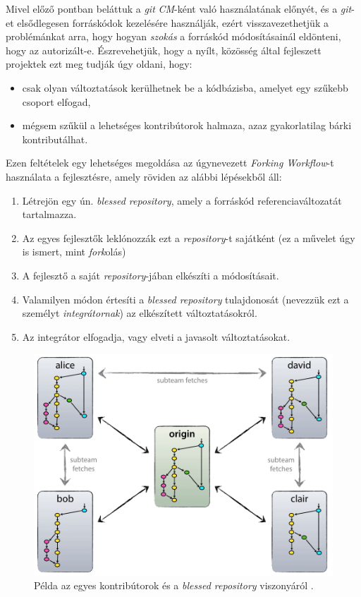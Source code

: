 Mivel előző pontban beláttuk a \emph{git} \emph{CM}-ként való  használatának előnyét, és
a \emph{git}-et elsődlegesen forráskódok kezelésére használják, ezért visszavezethetjük
a problémánkat arra, hogy hogyan \emph{szokás} a forráskód módosításainál eldönteni, hogy az
autorizált-e.  Észrevehetjük, hogy a nyílt, közösség által fejleszett projektek ezt meg tudják úgy
oldani, hogy:
\begin{itemize}
    \item{csak olyan változtatások kerülhetnek be a kódbázisba, amelyet egy szűkebb csoport
        elfogad,}
    \item{mégsem szűkül a lehetséges kontribútorok halmaza, azaz gyakorlatilag bárki
        kontributálhat.}
\end{itemize}

Ezen feltételek egy lehetséges megoldása az úgynevezett \emph{Forking Workflow}-t használata
a fejlesztésre, amely röviden az alábbi lépésekből áll:
\begin{enumerate}
    \item{Létrejön egy ún. \emph{blessed repository}, amely a forráskód referenciaváltozatát
        tartalmazza.}
    \item{Az egyes fejlesztők leklónozzák ezt a \emph{repository}-t sajátként (ez a művelet úgy is
        ismert, mint \emph{fork}olás)}
    \item{A fejlesztő a saját \emph{repository}-jában elkészíti a módosításait.}
    \item{Valamilyen módon értesíti a \emph{blessed repository} tulajdonosát
        (nevezzük ezt a személyt \emph{integrátornak}) az elkészített változtatásokról.}
    \item{Az integrátor elfogadja, vagy elveti a javasolt változtatásokat.}
\end{enumerate}

\begin{figure}[h]
    \centering
    \includegraphics[width=\textwidth, height=0.25\textheight, keepaspectratio]{figures/forkingworkflow.png}
    \caption{Példa az egyes kontribútorok és a \emph{blessed repository} viszonyáról
    \cite{ForkingWorkflow}.}
\end{figure}
\FloatBarrier

